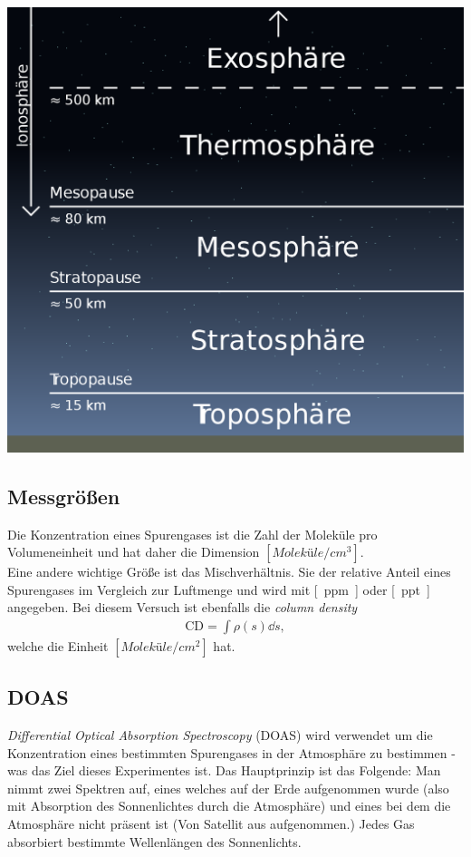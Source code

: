 \documentclass[12pt, a4paper, bibliography=totoc]{scrartcl}
\begin{document}
\begin{multicols}{2}
\begin{center}
    \includegraphics[width=.8\linewidth]{fig/erdatmosphäre.png}
    \label{fig:gas_spectra}
\end{center}

\subsection{Messgrößen}\label{ssec:Messgröße}

    Die Konzentration eines Spurengases ist die Zahl der Moleküle pro Volumeneinheit und hat daher die Dimension $\si{[Moleküle/cm^3]}$.\\
Eine andere wichtige Größe ist das Mischverhältnis.
Sie der relative Anteil eines Spurengases im Vergleich zur Luftmenge und wird mit \si{[ppm]} oder \si{[ppt]} angegeben. 
    Bei diesem Versuch ist ebenfalls die \textit{column density}
    \begin{align}
        \text{CD} = \int \rho(s) \dd s,
    \end{align}
    welche die Einheit $\si{[Moleküle / cm^2]}$ hat.
\subsection{DOAS}\label{ssec:DOAS}

\textit{Differential Optical Absorption Spectroscopy} (DOAS) wird verwendet um die Konzentration eines bestimmten Spurengases in der Atmosphäre zu bestimmen - was das Ziel dieses Experimentes ist.
Das Hauptprinzip ist das Folgende: 
    Man nimmt zwei Spektren auf, eines welches auf der Erde aufgenommen wurde (also mit Absorption des Sonnenlichtes durch die Atmosphäre) und eines bei dem die Atmosphäre nicht präsent ist (Von Satellit aus aufgenommen.)
Jedes Gas absorbiert bestimmte Wellenlängen des Sonnenlichts.


\end{multicols}
\end{document}
